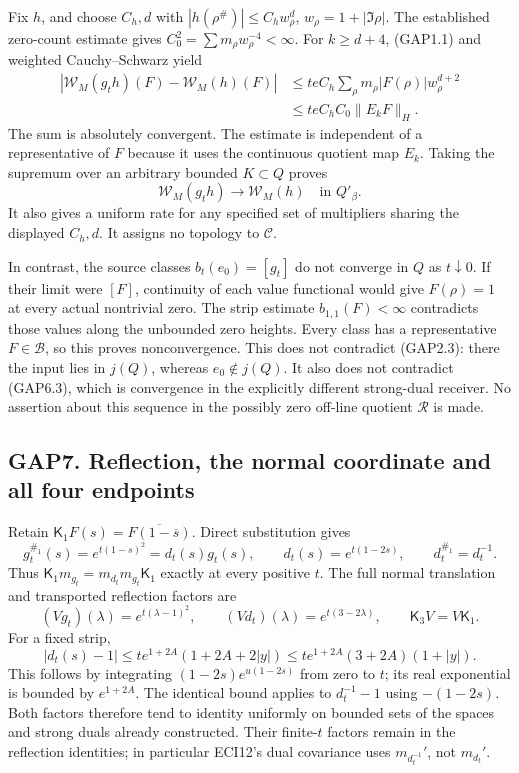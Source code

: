 Fix \(h\), and choose \(C_h,d\) with \(|h(\rho^\#)|\le C_h w_\rho^d\),
\(w_\rho=1+|\Im\rho|\). The established zero-count estimate gives
\(C_0^2=\sum m_\rho w_\rho^{-4}<\infty\). For \(k\ge d+4\), (GAP1.1) and
weighted Cauchy--Schwarz yield \[
\begin{aligned}
|\mathcal W_M(g_th)(F)-\mathcal W_M(h)(F)|
&\le teC_h\sum_\rho m_\rho|F(\rho)|w_\rho^{d+2}\\
&\le teC_h C_0\|E_kF\|_H.
\end{aligned}
\tag{GAP6.2}
\] The sum is absolutely convergent. The estimate is independent of a
representative of \(F\) because it uses the continuous quotient map
\(E_k\). Taking the supremum over an arbitrary bounded \(K\subset Q\)
proves \[
\boxed{\mathcal W_M(g_th)\longrightarrow\mathcal W_M(h)
\quad\text{in }Q'_\beta.}
\tag{GAP6.3}
\] It also gives a uniform rate for any specified set of multipliers
sharing the displayed \(C_h,d\). It assigns no topology to
\(\mathscr C\).

In contrast, the source classes \(b_t(e_0)=[g_t]\) do not converge in
\(Q\) as \(t\downarrow0\). If their limit were \([F]\), continuity of
each value functional would give \(F(\rho)=1\) at every actual
nontrivial zero. The strip estimate \(b_{1,1}(F)<\infty\) contradicts
those values along the unbounded zero heights. Every class has a
representative \(F\in\mathcal B\), so this proves nonconvergence. This
does not contradict (GAP2.3): there the input lies in \(j(Q)\), whereas
\(e_0\notin j(Q)\). It also does not contradict (GAP6.3), which is
convergence in the explicitly different strong-dual receiver. No
assertion about this sequence in the possibly zero off-line quotient
\(\mathcal R\) is made.

\subsection{GAP7. Reflection, the normal coordinate and all four
endpoints}\label{gap7.-reflection-the-normal-coordinate-and-all-four-endpoints}

Retain \(\mathsf K_1F(s)=\overline{F(1-\overline s)}\). Direct
substitution gives \[
g_t^{\#_1}(s)=e^{t(1-s)^2}=d_t(s)g_t(s),\qquad
d_t(s)=e^{t(1-2s)},\qquad d_t^{\#_1}=d_t^{-1}.
\tag{GAP7.1}
\] Thus \(\mathsf K_1m_{g_t}=m_{d_t}m_{g_t}\mathsf K_1\) exactly at
every positive \(t\). The full normal translation and transported
reflection factors are \[
(Vg_t)(\lambda)=e^{t(\lambda-1)^2},\qquad
(Vd_t)(\lambda)=e^{t(3-2\lambda)},\qquad
\mathsf K_3V=V\mathsf K_1.
\tag{GAP7.2}
\] For a fixed strip, \[
|d_t(s)-1|\le t e^{1+2A}(1+2A+2|y|)
\le t e^{1+2A}(3+2A)(1+|y|).
\tag{GAP7.3}
\] This follows by integrating \((1-2s)e^{u(1-2s)}\) from zero to \(t\);
its real exponential is bounded by \(e^{1+2A}\). The identical bound
applies to \(d_t^{-1}-1\) using \(-(1-2s)\). Both factors therefore tend
to identity uniformly on bounded sets of the spaces and strong duals
already constructed. Their finite-\(t\) factors remain in the reflection
identities; in particular ECI12's dual covariance uses
\(m_{d_t^{-1}}'\), not \(m_{d_t}'\).

